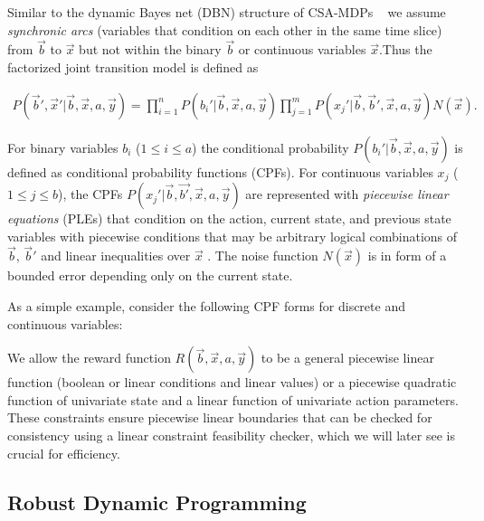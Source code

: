  
Similar to the dynamic Bayes net (DBN) structure of CSA-MDPs ~\cite{sdp_aaai} 
we assume \emph{synchronic arcs} (variables that condition on each
other in the same time slice) from $\vec{b}$ to $\vec{x}$ but not within the binary $\vec{b}$ or continuous variables $\vec{x}$.Thus the factorized joint transition model is defined as

{\footnotesize
\begin{align}
 P(\vec{b}',\vec{x}'|\vec{b},\vec{x}, a,\vec{y}) = \prod_{i=1}^n P(b_i'|\vec{b},\vec{x} ,a,\vec{y}) 
\prod_{j=1}^m P(x_j'|\vec{b},\vec{b}',\vec{x},a,\vec{y}) N(\vec{x}).  \nonumber
\end{align}
}

For binary variables $b_i$ ($1 \leq i \leq a$) the conditional probability $P(b_i'|\vec{b},\vec{x},a,\vec{y})$ is defined as 
conditional probability functions (CPFs).  For continuous variables $x_j$ ($1 \leq j \leq b$), the CPFs
$P(x_j'|\vec{b},\vec{b'},\vec{x},a,\vec{y})$ are represented with \emph{piecewise linear equations} (PLEs) that condition on the
action, current state, and previous state variables with piecewise conditions that may be arbitrary logical combinations of $\vec{b}$, $\vec{b}'$  and linear inequalities over $\vec{x}$ .  The noise function $N(\vec{x})$ is in form of a bounded error depending only on the current state. 

As a simple example, consider the following CPF forms for discrete and continuous variables: 

We allow the reward function $R(\vec{b},\vec{x},a,\vec{y})$ to be a general piecewise linear function (boolean or linear conditions
and linear values) or a piecewise quadratic function of univariate state and a linear function of univariate action parameters. 
These constraints ensure piecewise linear boundaries that can be checked for consistency using a linear constraint feasibility checker, which we will later see is crucial for efficiency.

\subsection{Robust Dynamic Programming}